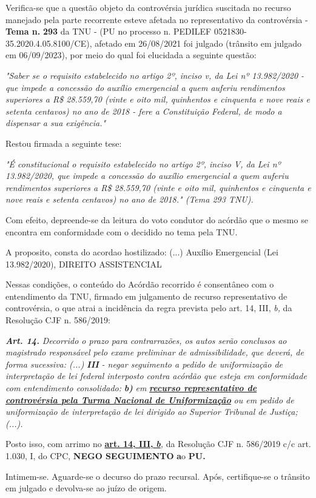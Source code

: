 \documentclass[12pt]{article}
\begin{document}
\justifying
\noindent Verifica-se que a questão objeto da controvérsia jurídica suscitada no recurso manejado pela parte recorrente esteve afetada no representativo da controvérsia - \textbf{Tema n. }\textbf{293} da TNU - (PU no processo n. PEDILEF 0521830-35.2020.4.05.8100/CE),  afetado em 26/08/2021 foi julgado (trânsito em julgado em 06/09/2023), por meio do qual foi elucidada a seguinte questão:

\noindent \textit{"Saber se o requisito estabelecido no artigo 2º, inciso v, da Lei nº 13.982/2020 - que impede a concessão do auxílio emergencial a quem auferiu rendimentos superiores a R\$ 28.559,70 (vinte e oito mil, quinhentos e cinquenta e nove reais e setenta centavos) no ano de 2018 - fere a Constituição Federal, de modo a dispensar a sua exigência."}

\noindent Restou firmada a seguinte tese:

\noindent \textit{"É constitucional o requisito estabelecido no artigo 2º, inciso V, da Lei nº 13.982/2020, que impede a concessão do auxílio emergencial a quem auferiu rendimentos superiores a R\$ 28.559,70 (vinte e oito mil, quinhentos e cinquenta e nove reais e setenta centavos) no ano de 2018." (Tema 293 TNU).}

\noindent Com efeito, depreende-se da leitura do voto condutor do acórdão que o mesmo se encontra em conformidade com o decidido no  tema pela TNU.

\noindent A proposito, consta do acordao hostilizado: (...) Auxílio Emergencial (Lei 13.982/2020), DIREITO ASSISTENCIAL

\noindent Nessas condições, o conteúdo do Acórdão recorrido é consentâneo com o entendimento da TNU, firmado em julgamento de recurso representativo de controvérsia, o que atrai a incidência da regra prevista pelo art. 14, III, \textit{b,} da Resolução CJF n. 586/2019:

\noindent \textit{\textbf{Art. 14.}}\textit{ Decorrido o prazo para contrarrazões, os autos serão conclusos ao magistrado responsável pelo exame preliminar de admissibilidade, que deverá, de forma sucessiva: (...) }\textit{\textbf{III }}\textit{- negar seguimento a pedido de uniformização de interpretação de lei federal interposto contra acórdão que esteja em conformidade com entendimento consolidado: }\textit{\textbf{b)}}\textit{ em }\uline{\textit{\textbf{recurso representativo de controvérsia pela Turma Nacional de Uniformização}}}\textit{ ou em pedido de uniformização de interpretação de lei dirigido ao Superior Tribunal de Justiça;(...).}

\noindent Posto isso, com arrimo no \uline{\textbf{art. 14, III, }}\uline{\textit{\textbf{b}}}\textit{,} da Resolução CJF n. 586/2019 c/c art. 1.030, I, do CPC, \textbf{NEGO SEGUIMENTO }\textbf{a}o\textbf{ PU}\textbf{.}

\noindent Intimem-se. Aguarde-se o decurso do prazo recursal. Após, certifique-se o trânsito em julgado e devolva-se ao juízo de origem.
\end{document}
